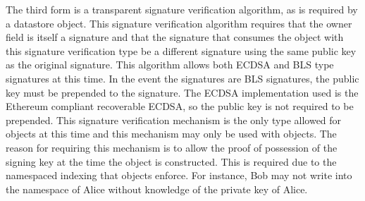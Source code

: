 The third form is a transparent signature verification algorithm, as
is required by a datastore object.
This signature verification algorithm requires that the owner field is
itself a signature and that the signature that consumes the object with
this signature verification type be a different signature using the
same public key as the original signature.
This algorithm allows both ECDSA and BLS type signatures at this time.
In the event the signatures are BLS  signatures, the public key must be
prepended to the signature.
The ECDSA implementation used is the Ethereum compliant recoverable
ECDSA, so the public key is not required to be prepended.
This signature verification mechanism is the only type allowed for
\DataStore{} objects at this time and this mechanism may only be used with
\DataStore{} objects.
The reason for requiring this mechanism is to allow the proof of
possession of the signing key at the time the object is constructed.
This is required due to the namespaced indexing that \DataStore{} objects
enforce.
For instance, Bob may not write into the namespace of Alice without
knowledge of the private key of Alice.
